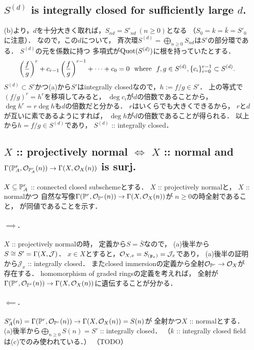 \documentclass[a4paper]{jsarticle}
\newcommand{\shJ}{\mathcal{J}}
\newcommand{\shO}{\mathcal{O}}
\begin{document}
    \subsection{$S^{(d)}$ is integrally closed for sufficiently large $d$.}
    (b)より，$d$を十分大きく取れば，$S_{nd}=S'_{nd} ~(n \geq 0)$となる
    （$S_0=k=\bar{k}=S'_0$に注意）．
    なので，この$d$について，
    斉次環$S^{(d)}=\bigoplus_{n \geq 0} S_{nd}$は$S'$の部分環である．
    $S^{(d)}$の元を係数に持つ
    多項式が$\operatorname{Quot}(S^{(d)})$に根を持っていたとする．
    \[
        \left(\frac{f}{g}\right)^r+c_{r-1}\left(\frac{f}{g}\right)^{r-1}+\dots+c_0=0
        ~~\text{where}~~
        f,g \in S^{(d)}, \{c_i\}_{i=0}^{r-1} \subset S^{(d)}.
    \]
    $S^{(d)} \subset S'$かつ(a)から$S'$はintegrally closedなので，$h:=f/g \in S'$．
    上の等式で$(f/g)^r=h^r$を移項してみると，
    $\deg c_i$が$d$の倍数であることから，
    $\deg h^r=r \deg h$も$d$の倍数だと分かる．
    $r$はいくらでも大きくできるから，
    $r$と$d$が互いに素であるようにすれば，
    $\deg h$が$d$の倍数であることが得られる．
    以上から$h=f/g \in S^{(d)}$であり，
    $S^{(d)}$ :: integrally closed．

    \subsection{$X$ :: projectively normal $\iff$ $X$ :: normal and
        $\Gamma(\proj^r_A, \shO_{\proj^r_A}(n)) \to \Gamma(X,\shO_X(n))$ is surj.}

    $X \subseteq \mathbb{P}^r_A$ :: connected closed subschemeとする．
    $X$ :: projectively normalと，
    $X$ :: normalかつ
    自然な写像$\Gamma(\proj^r, \shO_{\proj^r}(n)) \to \Gamma(X,\shO_X(n))$が
    $n \geq 0$の時全射であること，
    が同値であることを示す．

    \paragraph{$\implies$.}
    $X$ :: projectively normalの時，
    定義から$S=\bar{S}$なので，
    (a)後半から$S \iso S'=\Gamma(X,\shJ)$．
    $x \in X$とすると，$\shO_{X,x}=S_{(\I{p}_x)}=\shJ_x$であり，
    (a)後半の証明から$\shJ_x$ :: integrally closed．
    またclosed immersionの定義から全射$\shO_{\proj^r} \to \shO_{X}$が存在する．
    homomorphism of graded ringsの定義を考えれば，
    全射が$\Gamma(\proj^r, \shO_{\proj^r}(n)) \to \Gamma(X,\shO_X(n))$に遺伝することが分かる．

    \paragraph{$\impliedby$.}
    $S_A^r(n)=\Gamma(\proj^r, \shO_{\proj^r}(n)) \to \Gamma(X,\shO_X(n))=S(n)$が
    全射かつ$X$ :: normalとする．
    (a)後半から$\bigoplus_{n \geq 0} S(n)=S'$ :: integrally closed．
    （$k$ :: integrally closed fieldは(c)でのみ使われている．）
    （TODO）
\end{document}
